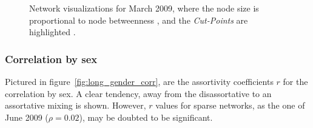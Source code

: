 \begin{figure}[htpb]%
	\centering 
	
	\qquad 			
	\caption[Network visualizations for March 2009]{Network visualizations for March 2009, where the node size is proportional to node betweenness , and the \textit{Cut-Points} are highlighted .}
	 \label{fig:graphs_march}
\end{figure} 


\subsubsection{Correlation by sex}

Pictured in figure~\ref{fig:long_gender_corr}, are the assortivity coefficients $r$ for the correlation by sex. A clear tendency, away from the disassortative to an assortative mixing is shown. However, $r$ values for sparse networks, as the one of June 2009 ($\rho = 0.02$), may be doubted to be significant.

